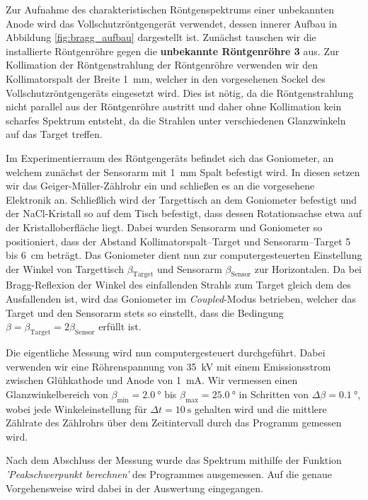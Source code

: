 \documentclass[11pt, a4paper]{article}
\begin{document}
Zur Aufnahme des charakteristischen Röntgenspektrums einer unbekannten Anode wird das Vollschutzröntgengerät verwendet, dessen innerer Aufbau in Abbildung \ref{fig:bragg_aufbau} dargestellt ist.
Zunächst tauschen wir die installierte Röntgenröhre gegen die \textbf{unbekannte Röntgenröhre 3} aus.
Zur Kollimation der Röntgenstrahlung der Röntgenröhre verwenden wir den Kollimatorspalt der Breite \SI{1}{\milli\metre}, welcher in den vorgesehenen Sockel des Vollschutzröntgengeräts eingesetzt wird.
Dies ist nötig, da die Röntgenstrahlung nicht parallel aus der Röntgenröhre austritt und daher ohne Kollimation kein scharfes Spektrum entsteht, da die Strahlen unter verschiedenen Glanzwinkeln auf das Target treffen.

Im Experimentierraum des Röntgengeräts befindet sich das Goniometer, an welchem zunächst der Sensorarm mit \SI{1}{\milli\metre} Spalt befestigt wird.
In diesen setzen wir das Geiger-Müller-Zählrohr ein und schließen es an die vorgesehene Elektronik an.
Schließlich wird der Targettisch an dem Goniometer befestigt und der NaCl-Kristall so auf dem Tisch befestigt, dass dessen Rotationsachse etwa auf der Kristalloberfläche liegt.
Dabei wurden Sensorarm und Goniometer so positioniert, dass der Abstand Kollimatorspalt--Target und Sensorarm--Target \num{5} bis \SI{6}{\centi\metre} beträgt.
Das Goniometer dient nun zur computergesteuerten Einstellung der Winkel von Targettisch $\beta_\mathrm{Target}$ und Sensorarm $\beta_\mathrm{Sensor}$ zur Horizontalen.
Da bei Bragg-Reflexion der Winkel des einfallenden Strahls zum Target gleich dem des Ausfallenden ist, wird das Goniometer im \emph{Coupled}-Modus betrieben, welcher das Target und den Sensorarm stets so einstellt, dass die Bedingung $\beta = \beta_\mathrm{Target} = 2\beta_\mathrm{Sensor}$ erfüllt ist.

Die eigentliche Messung wird nun computergesteuert durchgeführt.
Dabei verwenden wir eine Röhrenspannung von \SI{35}{\kilo\volt} mit einem Emissionsstrom zwischen Glühkathode und Anode von \SI{1}{\milli\ampere}.
Wir vermessen einen Glanzwinkelbereich von $\beta_\mathrm{min} = \SI{2,0}{\degree}$ bis $\beta_\mathrm{max} = \SI{25,0}{\degree}$ in Schritten von $\Delta \beta = \SI{0,1}{\degree}$, wobei jede Winkeleinstellung für $\Delta t = \SI{10}{\second}$ gehalten wird und die mittlere Zählrate des Zählrohrs über dem Zeitintervall durch das Programm gemessen wird.

Nach dem Abschluss der Messung wurde das Spektrum mithilfe der Funktion \emph{'Peakschwerpunkt berechnen'} des Programmes ausgemessen. Auf die genaue Vorgehensweise wird dabei in der Auswertung eingegangen.
\end{document}
